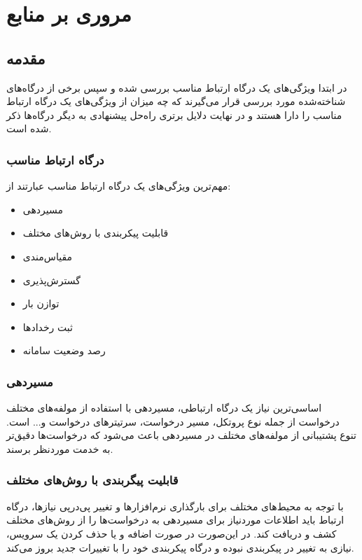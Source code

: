 \section{مروری بر منابع}\label{sec:sources}

\subsection{مقدمه}\label{subsec:sources_subject}
در ابتدا ویژگی‌های یک درگاه ارتباط مناسب بررسی شده و سپس برخی از درگاه‌های شناخته‌شده‌ مورد بررسی قرار می‌گیرند که چه میزان از ویژگی‌های یک درگاه ارتباط مناسب را دارا هستند و در نهایت دلایل برتری راه‌حل پیشنهادی به دیگر درگاه‌ها ذکر شده است.


\subsubsection{درگاه ارتباط مناسب}\label{subsec:sources_gateway}
مهم‌ترین ویژگی‌های یک درگاه ارتباط مناسب عبارتند از:

\begin{itemize}
    \item مسیردهی
    \item قابلیت پیکربندی با روش‌های مختلف
    \item مقیاس‌مندی
    \item گسترش‌پذیری
    \item توازن بار
    \item ثبت رخداد‌ها
    \item رصد وضعیت سامانه
\end{itemize}

\subsubsection{مسیر‌دهی}
اساسی‌ترین نیاز یک درگاه ارتباطی، مسیر‌دهی با استفاده از مولفه‌های مختلف درخواست از جمله نوع پروتکل، مسیر درخواست، سرتیتر‌های درخواست و... است. تنوع پشتیبانی از مولفه‌های مختلف در مسیر‌دهی باعث می‌شود که درخواست‌ها دقیق‌تر به خدمت مورد‌نظر برسند.

\subsubsection{قابلیت پیگربندی با روش‌‌های مختلف}
با توجه به محیط‌های مختلف برای بارگذاری نرم‌افزارها و تغییر پی‌در‌پی نیازها، درگاه ارتباط باید اطلاعات مورد‌نیاز برای مسیر‌دهی به درخواست‌ها را از روش‌های مختلف کشف و دریافت کند. در این‌صورت در صورت اضافه و یا حذف کردن یک سرویس، نیازی به تغییر در پیکربندی نبوده و درگاه پیکربندی خود را با تغییرات جدید بروز می‌کند.

